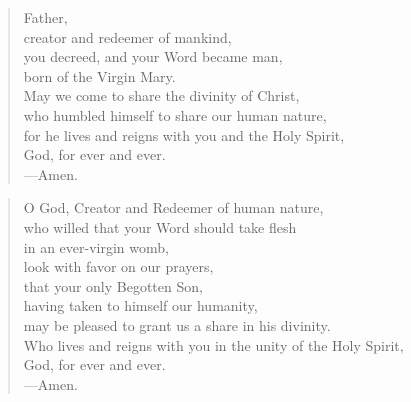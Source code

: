 \prayer

\setlength{\vleftmargin}{\prayerleftmargini}

\begin{verse}
Father,\\
creator and redeemer of mankind,\\
you decreed, and your Word became man,\\
born of the Virgin Mary.\\
May we come to share the divinity of Christ,\\
who humbled himself to share our human nature,\\
for he lives and reigns with you and the Holy Spirit,\\
God, for ever and ever.\\
{\color{red}---\thinspace}Amen.
\end{verse}


\begin{verse}
O God, Creator and Redeemer of human nature,\\
who willed that your Word should take flesh\\
in an ever-virgin womb,\\
look with favor on our prayers,\\
that your only Begotten Son,\\
having taken to himself our humanity,\\
may be pleased to grant us a share in his divinity.\\
Who lives and reigns with you in the unity of the Holy Spirit,\\
God, for ever and ever.\\
{\color{red}---\thinspace}Amen.

\end{verse}

\setlength{\vleftmargin}{\defleftmargini}